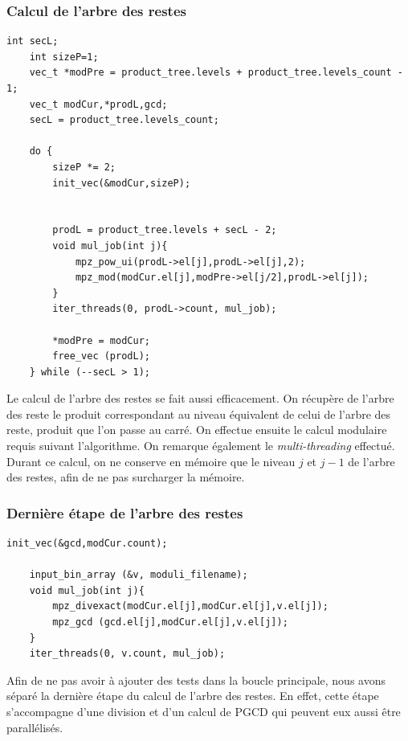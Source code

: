 \subsubsection{Calcul de l'arbre des restes}

\begin{lstlisting}[style=customc,caption=fact\_superspeed.c - partie 3, label=fact3]
	int secL;
	int sizeP=1; 
	vec_t *modPre = product_tree.levels + product_tree.levels_count - 1;
	vec_t modCur,*prodL,gcd;
	secL = product_tree.levels_count;
	
	do {
		sizeP *= 2; 
		init_vec(&modCur,sizeP);	
	

		prodL = product_tree.levels + secL - 2;
		void mul_job(int j){			
			mpz_pow_ui(prodL->el[j],prodL->el[j],2); 
			mpz_mod(modCur.el[j],modPre->el[j/2],prodL->el[j]); 	
		}
		iter_threads(0, prodL->count, mul_job);
		
		*modPre = modCur;
		free_vec (prodL);	
	} while (--secL > 1);

\end{lstlisting}

Le calcul de l'arbre des restes se fait aussi efficacement. On récupère de l'arbre des reste le produit correspondant au niveau équivalent de celui de l'arbre des reste, produit que l'on passe au carré. On effectue ensuite le calcul modulaire requis suivant l'algorithme. On remarque également le \textit{multi-threading} effectué. Durant ce calcul, on ne conserve en mémoire que le niveau $j$ et $j-1$ de l'arbre des restes, afin de ne pas surcharger la mémoire. \\



\subsubsection{Dernière étape de l'arbre des restes}

\begin{lstlisting}[style=customc,caption=fact\_superspeed.c - partie 4, label=fact4]
init_vec(&gcd,modCur.count);
	
	input_bin_array (&v, moduli_filename);
	void mul_job(int j){
		mpz_divexact(modCur.el[j],modCur.el[j],v.el[j]); 
		mpz_gcd (gcd.el[j],modCur.el[j],v.el[j]); 
	}
	iter_threads(0, v.count, mul_job);
\end{lstlisting}

Afin de ne pas avoir à ajouter des tests dans la boucle principale, nous avons séparé la dernière étape du calcul de l'arbre des restes. En effet, cette étape s'accompagne d'une division et d'un calcul de PGCD qui peuvent eux aussi être parallélisés. \\





